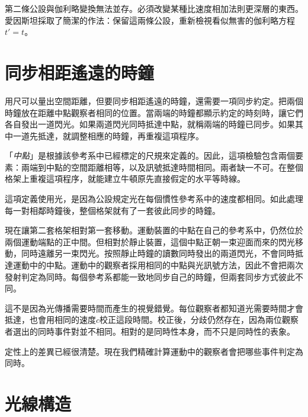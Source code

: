 第二條公設與伽利略變換無法並存。必須改變某種比速度相加法則更深層的東西。愛因斯坦採取了簡潔的作法：保留這兩條公設，重新檢視看似無害的伽利略方程\(t'=t\)。

\section{同步相距遙遠的時鐘}

用尺可以量出空間距離，但要同步相距遙遠的時鐘，還需要一項同步約定。把兩個時鐘放在距離中點觀察者相同的位置。當兩端的時鐘都顯示約定的時刻時，讓它們各自發出一道閃光。如果兩道閃光同時抵達中點，就稱兩端的時鐘已同步。如果其中一道先抵達，就調整相應的時鐘，再重複這項程序。

「\emph{中點}」是根據該參考系中已經標定的尺規來定義的。因此，這項檢驗包含兩個要素：兩端到中點的空間距離相等，以及訊號抵達時間相同。兩者缺一不可。在整個格架上重複這項程序，就能建立牛頓原先直接假定的水平等時線。

這項定義使用光，是因為公設規定光在每個慣性參考系中的速度都相同。如此處理每一對相鄰時鐘後，整個格架就有了一套彼此同步的時鐘。

現在讓第二套格架相對第一套移動。運動裝置的中點在自己的參考系中，仍然位於兩個運動端點的正中間。但相對於靜止裝置，這個中點正朝一束迎面而來的閃光移動，同時遠離另一束閃光。按照靜止時鐘的讀數同時發出的兩道閃光，不會同時抵達運動中的中點。運動中的觀察者採用相同的中點與光訊號方法，因此不會把兩次發射判定為同時。每個參考系都能一致地同步自己的時鐘，但兩套同步方式彼此不同。

這不是因為光傳播需要時間而產生的視覺錯覺。每位觀察者都知道光需要時間才會抵達，也會用相同的速度\(c\)校正這段時間。校正後，分歧仍然存在，因為兩位觀察者選出的同時事件對並不相同。相對的是同時性本身，而不只是同時性的表象。

\begin{classroomqa}
\end{classroomqa}

定性上的差異已經很清楚。現在我們精確計算運動中的觀察者會把哪些事件判定為同時。

\section{光線構造}

